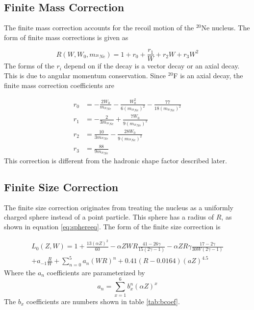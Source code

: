 \documentclass[../MaxHughesThesis.tex]{subfiles}
\begin{document}
\subsection{Finite Mass Correction}
The finite mass correction accounts for the recoil motion of the $^{20}$Ne nucleus.
The form of finite mass corrections is given as \cite{WIL90} %

\begin{equation}
	R(W,W_{0},m_{^{20}Ne}) = 1 + r_{0} + \frac{r_{1}}{W} + r_{2}W + r_{3}W^{2}
	\label{eq:finitemass}
\end{equation}
The forms of the $r_{i}$ depend on if the decay is a vector decay or an axial decay. 
This is due to angular momentum conservation.
Since $^{20}$F is an axial decay, the finite mass correction coefficients are %

\begin{equation}
	\label{eq:finitemassrs}
	\begin{split}
	r_{0} & = -\frac{2W_{0}}{m_{^{20}Ne}} - \frac{W_{0}^{2}}{6(m_{^{20}Ne})^{2}} - \frac{77}{18(m_{ ^{20}Ne})^{2}} \\
	r_{1} & = -\frac{2}{3m_{^{20}Ne}} + \frac{7W_{0}}{9(m_{^{20}Ne})^{2}} \\
	r_{2} & = \frac{10}{3m_{^{20}Ne}} - \frac{28W_{0}}{9(m_{^{20}Ne})^{2}} \\
	r_{3} & = \frac{88}{9m_{^{20}Ne}}
	\end{split}
\end{equation}
This correction is different from the hadronic shape factor described later. 

\subsection{Finite Size Correction}
The finite size correction originates from treating the nucleus as a uniformly charged sphere instead of a point particle.
This sphere has a radius of $R$, as shown in equation \ref{eq:sphereeq}.
The form of the finite size correction is \cite{WIL90} %

\begin{equation}
	\label{eq:finitesize}
	\begin{split}
	L_{0}(Z,W) = 1 + \frac{13(\alpha Z)^{2}}{60} - \alpha Z W R \frac{41 - 26\gamma}{15(2\gamma - 1)} - \alpha Z R \gamma \frac{17 - 2\gamma}{30W(2\gamma - 1)}  \\
	+ a_{-1} \frac{R}{W} + \sum_{n=0}^{5} a_{n} (W R)^{n} + 0.41(R - 0.0164)(a Z)^{4.5}
	\end{split}
\end{equation}
Where the $a_{n}$ coefficients are parameterized by %
\begin{equation}
	a_{n} = \sum_{x = 1}^{6} b_{x}^{n} (\alpha Z)^{x}
	\label{eq:A}
\end{equation}
The $b_{x}$ coefficients are numbers shown in table \ref{tab:bcoef}.
\end{document}
